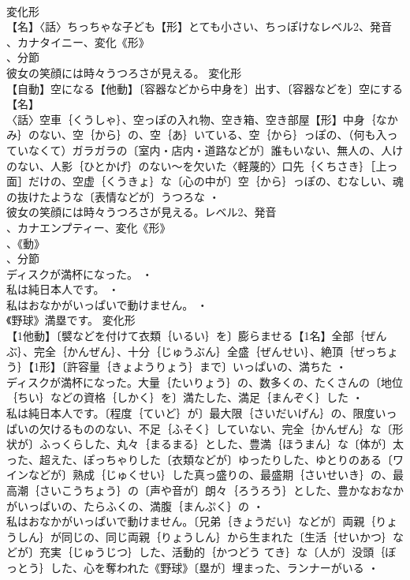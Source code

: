 \documentclass[8pt]{extreport}
\begin{document}
\begin{CJK}{UTF8}{min}
\\	変化形 
\\	【名】〈話〉ちっちゃな子ども【形】とても小さい、ちっぽけなレベル2、発音
\\	、カナタイニー、変化《形》
\\	、分節
\\	彼女の笑顔には時々うつろさが見える。	変化形 
\\	【自動】空になる【他動】〔容器などから中身を〕出す、〔容器などを〕空にする【名】
\\	〈話〉空車｛くうしゃ｝、空っぽの入れ物、空き箱、空き部屋【形】中身｛なかみ｝のない、空｛から｝の、空｛あ｝いている、空｛から｝っぽの、（何も入っていなくて）ガラガラの〔室内・店内・道路などが〕誰もいない、無人の、人けのない、人影｛ひとかげ｝のない～を欠いた〈軽蔑的〉口先｛くちさき｝［上っ面］だけの、空虚｛くうきょ｝な〔心の中が〕空｛から｝っぽの、むなしい、魂の抜けたような〔表情などが〕うつろな ・
\\	彼女の笑顔には時々うつろさが見える。レベル2、発音
\\	、カナエンプティー、変化《形》
\\	、《動》
\\	、分節
\\	ディスクが満杯になった。 ・
\\	私は純日本人です。 ・
\\	私はおなかがいっぱいで動けません。 ・
\\	《野球》満塁です。	変化形 
\\	【1他動】〔襞などを付けて衣類｛いるい｝を〕膨らませる【1名】全部｛ぜんぶ｝、完全｛かんぜん｝、十分｛じゅうぶん｝全盛｛ぜんせい｝、絶頂｛ぜっちょう｝【1形】〔許容量｛きょようりょう｝まで〕いっぱいの、満ちた ・
\\	ディスクが満杯になった。大量｛たいりょう｝の、数多くの、たくさんの〔地位｛ちい｝などの資格｛しかく｝を〕満たした、満足｛まんぞく｝した ・
\\	私は純日本人です。〔程度｛ていど｝が〕最大限｛さいだいげん｝の、限度いっぱいの欠けるもののない、不足｛ふそく｝していない、完全｛かんぜん｝な〔形状が〕ふっくらした、丸々｛まるまる｝とした、豊満｛ほうまん｝な〔体が〕太った、超えた、ぽっちゃりした〔衣類などが〕ゆったりした、ゆとりのある〔ワインなどが〕熟成｛じゅくせい｝した真っ盛りの、最盛期｛さいせいき｝の、最高潮｛さいこうちょう｝の〔声や音が〕朗々｛ろうろう｝とした、豊かなおなかがいっぱいの、たらふくの、満腹｛まんぷく｝の ・
\\	私はおなかがいっぱいで動けません。〔兄弟｛きょうだい｝などが〕両親｛りょうしん｝が同じの、同じ両親｛りょうしん｝から生まれた〔生活｛せいかつ｝などが〕充実｛じゅうじつ｝した、活動的｛かつどう てき｝な〔人が〕没頭｛ぼっとう｝した、心を奪われた《野球》〔塁が〕埋まった、ランナーがいる ・

\end{CJK}
\end{document}
